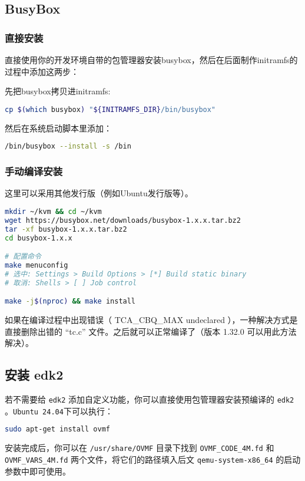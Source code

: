 \subsection{BusyBox}
\subsubsection{直接安装}
直接使用你的开发环境自带的包管理器安装busybox，然后在后面制作initramfs的过程中添加这两步：

先把busybox拷贝进initramfs:
\begin{lstlisting}[language=bash]
cp $(which busybox) "${INITRAMFS_DIR}/bin/busybox"
\end{lstlisting}

然后在系统启动脚本里添加：
\begin{lstlisting}[language=bash]
/bin/busybox --install -s /bin
\end{lstlisting}
\subsubsection{手动编译安装}
这里可以采用其他发行版（例如Ubuntu发行版等）。
\begin{lstlisting}[language=bash]
mkdir ~/kvm && cd ~/kvm
wget https://busybox.net/downloads/busybox-1.x.x.tar.bz2
tar -xf busybox-1.x.x.tar.bz2
cd busybox-1.x.x

# 配置命令
make menuconfig
# 选中: Settings > Build Options > [*] Build static binary
# 取消: Shells > [ ] Job control

make -j$(nproc) && make install
\end{lstlisting}
如果在编译过程中出现错误（ TCA\_CBQ\_MAX undeclared ），一种解决方式是直接删除出错的 “tc.c” 文件。之后就可以正常编译了（版本 1.32.0 可以用此方法解决）。

\subsection{安装 edk2}
若不需要给 \texttt{edk2} 添加自定义功能，你可以直接使用包管理器安装预编译的 \texttt{edk2} 。\texttt{Ubuntu 24.04}下可以执行：
\begin{lstlisting}[language=bash]
sudo apt-get install ovmf
\end{lstlisting}

安装完成后，你可以在 \texttt{/usr/share/OVMF} 目录下找到 \texttt{OVMF\_CODE\_4M.fd} 和 \texttt{OVMF\_VARS\_4M.fd} 两个文件，将它们的路径填入后文 \texttt{qemu-system-x86\_64} 的启动参数中即可使用。

